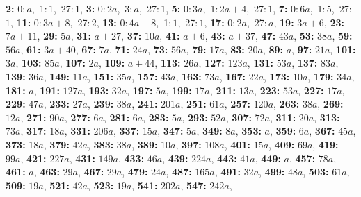 \textsf{\bfseries 2:} 0:\,$a$,\ 1:\,$1$,\ 27:\,$1$, \textsf{\bfseries 3:} 0:\,$2a$,\ 3:\,$a$,\ 27:\,$1$, \textsf{\bfseries 5:} 0:\,$3a$,\ 1:\,$2a + 4$,\ 27:\,$1$, \textsf{\bfseries 7:} 0:\,$6a$,\ 1:\,$5$,\ 27:\,$1$, \textsf{\bfseries 11:} 0:\,$3a + 8$,\ 27:\,$2$, \textsf{\bfseries 13:} 0:\,$4a + 8$,\ 1:\,$1$,\ 27:\,$1$, \textsf{\bfseries 17:} 0:\,$2a$,\ 27:\,$a$, \textsf{\bfseries 19:} $3a + 6$, \textsf{\bfseries 23:} $7a + 11$, \textsf{\bfseries 29:} $5a$, \textsf{\bfseries 31:} $a + 27$, \textsf{\bfseries 37:} $10a$, \textsf{\bfseries 41:} $a + 6$, \textsf{\bfseries 43:} $a + 37$, \textsf{\bfseries 47:} $43a$, \textsf{\bfseries 53:} $38a$, \textsf{\bfseries 59:} $56a$, \textsf{\bfseries 61:} $3a + 40$, \textsf{\bfseries 67:} $7a$, \textsf{\bfseries 71:} $24a$, \textsf{\bfseries 73:} $56a$, \textsf{\bfseries 79:} $17a$, \textsf{\bfseries 83:} $20a$, \textsf{\bfseries 89:} $a$, \textsf{\bfseries 97:} $21a$, \textsf{\bfseries 101:} $3a$, \textsf{\bfseries 103:} $85a$, \textsf{\bfseries 107:} $2a$, \textsf{\bfseries 109:} $a + 44$, \textsf{\bfseries 113:} $26a$, \textsf{\bfseries 127:} $123a$, \textsf{\bfseries 131:} $53a$, \textsf{\bfseries 137:} $83a$, \textsf{\bfseries 139:} $36a$, \textsf{\bfseries 149:} $11a$, \textsf{\bfseries 151:} $35a$, \textsf{\bfseries 157:} $43a$, \textsf{\bfseries 163:} $73a$, \textsf{\bfseries 167:} $22a$, \textsf{\bfseries 173:} $10a$, \textsf{\bfseries 179:} $34a$, \textsf{\bfseries 181:} $a$, \textsf{\bfseries 191:} $127a$, \textsf{\bfseries 193:} $32a$, \textsf{\bfseries 197:} $5a$, \textsf{\bfseries 199:} $17a$, \textsf{\bfseries 211:} $13a$, \textsf{\bfseries 223:} $53a$, \textsf{\bfseries 227:} $17a$, \textsf{\bfseries 229:} $47a$, \textsf{\bfseries 233:} $27a$, \textsf{\bfseries 239:} $38a$, \textsf{\bfseries 241:} $201a$, \textsf{\bfseries 251:} $61a$, \textsf{\bfseries 257:} $120a$, \textsf{\bfseries 263:} $38a$, \textsf{\bfseries 269:} $12a$, \textsf{\bfseries 271:} $90a$, \textsf{\bfseries 277:} $6a$, \textsf{\bfseries 281:} $6a$, \textsf{\bfseries 283:} $5a$, \textsf{\bfseries 293:} $52a$, \textsf{\bfseries 307:} $72a$, \textsf{\bfseries 311:} $20a$, \textsf{\bfseries 313:} $73a$, \textsf{\bfseries 317:} $18a$, \textsf{\bfseries 331:} $206a$, \textsf{\bfseries 337:} $15a$, \textsf{\bfseries 347:} $5a$, \textsf{\bfseries 349:} $8a$, \textsf{\bfseries 353:} $a$, \textsf{\bfseries 359:} $6a$, \textsf{\bfseries 367:} $45a$, \textsf{\bfseries 373:} $18a$, \textsf{\bfseries 379:} $42a$, \textsf{\bfseries 383:} $38a$, \textsf{\bfseries 389:} $10a$, \textsf{\bfseries 397:} $108a$, \textsf{\bfseries 401:} $15a$, \textsf{\bfseries 409:} $69a$, \textsf{\bfseries 419:} $99a$, \textsf{\bfseries 421:} $227a$, \textsf{\bfseries 431:} $149a$, \textsf{\bfseries 433:} $46a$, \textsf{\bfseries 439:} $224a$, \textsf{\bfseries 443:} $41a$, \textsf{\bfseries 449:} $a$, \textsf{\bfseries 457:} $78a$, \textsf{\bfseries 461:} $a$, \textsf{\bfseries 463:} $29a$, \textsf{\bfseries 467:} $29a$, \textsf{\bfseries 479:} $24a$, \textsf{\bfseries 487:} $165a$, \textsf{\bfseries 491:} $32a$, \textsf{\bfseries 499:} $48a$, \textsf{\bfseries 503:} $61a$, \textsf{\bfseries 509:} $19a$, \textsf{\bfseries 521:} $42a$, \textsf{\bfseries 523:} $19a$, \textsf{\bfseries 541:} $202a$, \textsf{\bfseries 547:} $242a$, 
